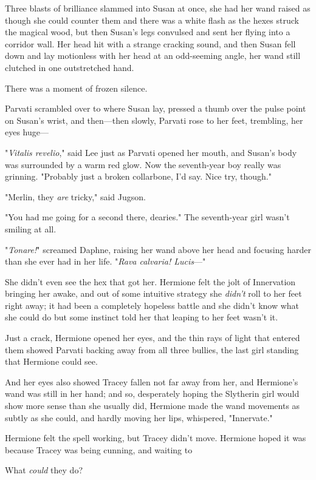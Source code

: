 Three blasts of brilliance slammed into Susan at once, she had her wand raised
as though she could counter them and there was a white flash as the hexes
struck the magical wood, but then Susan's legs convulsed and sent her flying
into a corridor wall. Her head hit with a strange cracking sound, and then
Susan fell down and lay motionless with her head at an odd-seeming angle, her
wand still clutched in one outstretched hand.

There was a moment of frozen silence.

Parvati scrambled over to where Susan lay, pressed a thumb over the pulse point
on Susan's wrist, and then---then slowly, Parvati rose to her
feet, trembling, her eyes huge\mbox{---}

"\emph{Vitalis revelio}," said Lee just as Parvati opened her mouth, and
Susan's body was surrounded by a warm red glow. Now the seventh-year boy really
was grinning. "Probably just a broken collarbone, I'd say. Nice try, though."

"Merlin, they \emph{are} tricky," said Jugson.

"You had me going for a second there, dearies." The seventh-year girl wasn't
smiling at all.

"\emph{Tonare!}" screamed Daphne, raising her wand above her head and focusing
harder than she ever had in her life. "\emph{Rava calvaria! Lucis}\mbox{---}"

She didn't even see the hex that got her.
\sbreak
Hermione felt the jolt of Innervation bringing her awake, and out of some
intuitive strategy she \emph{didn't} roll to her feet right away; it had been
a completely hopeless battle and she didn't know what she could do but some
instinct told her that leaping to her feet wasn't it.

Just a crack, Hermione opened her eyes, and the thin rays of light that entered
them showed Parvati backing away from all three bullies, the last girl standing
that Hermione could see.

And her eyes also showed Tracey fallen not far away from her, and Hermione's
wand was still in her hand; and so, desperately hoping the Slytherin girl would
show more sense than she usually did, Hermione made the wand movements as
subtly as she could, and hardly moving her lips, whispered, "Innervate."

Hermione felt the spell working, but Tracey didn't move. Hermione hoped it was
because Tracey was being cunning, and waiting to{\el}

What \emph{could} they do?

